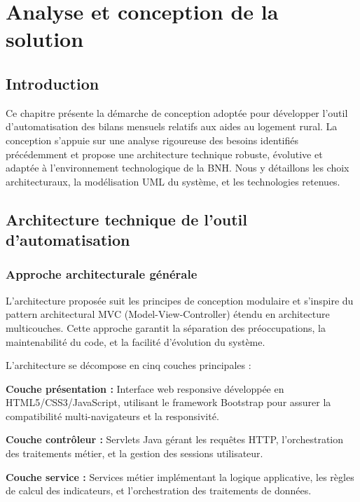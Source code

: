\chapter{Analyse et conception de la solution}
\clearpage
\label{chap:conception}

\section{Introduction}

Ce chapitre présente la démarche de conception adoptée pour développer l'outil d'automatisation des bilans mensuels relatifs aux aides au logement rural. La conception s'appuie sur une analyse rigoureuse des besoins identifiés précédemment et propose une architecture technique robuste, évolutive et adaptée à l'environnement technologique de la BNH. Nous y détaillons les choix architecturaux, la modélisation UML du système, et les technologies retenues.

\section{Architecture technique de l'outil d'automatisation}

\subsection{Approche architecturale générale}

L'architecture proposée suit les principes de conception modulaire et s'inspire du pattern architectural MVC (Model-View-Controller) étendu en architecture multicouches. Cette approche garantit la séparation des préoccupations, la maintenabilité du code, et la facilité d'évolution du système.

\medskip

L'architecture se décompose en cinq couches principales :

\textbf{Couche présentation :} Interface web responsive développée en HTML5/CSS3/JavaScript, utilisant le framework Bootstrap pour assurer la compatibilité multi-navigateurs et la responsivité.

\textbf{Couche contrôleur :} Servlets Java gérant les requêtes HTTP, l'orchestration des traitements métier, et la gestion des sessions utilisateur.

\textbf{Couche service :} Services métier implémentant la logique applicative, les règles de calcul des indicateurs, et l'orchestration des traitements de données.

